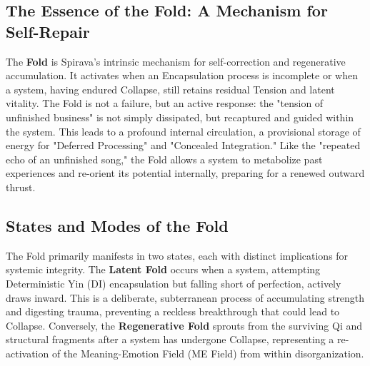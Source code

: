 \documentclass[11pt, a4paper]{article}
\begin{document}
\subsection{The Essence of the Fold: A Mechanism for Self-Repair}
The \textbf{Fold} is Spirava's intrinsic mechanism for self-correction and regenerative accumulation. It activates when an Encapsulation process is incomplete or when a system, having endured Collapse, still retains residual Tension and latent vitality. The Fold is not a failure, but an active response: the "tension of unfinished business" is not simply dissipated, but recaptured and guided within the system. This leads to a profound internal circulation, a provisional storage of energy for "Deferred Processing" and "Concealed Integration." Like the "repeated echo of an unfinished song," the Fold allows a system to metabolize past experiences and re-orient its potential internally, preparing for a renewed outward thrust.

\subsection{States and Modes of the Fold}
The Fold primarily manifests in two states, each with distinct implications for systemic integrity. The \textbf{Latent Fold} occurs when a system, attempting Deterministic Yin (DI) encapsulation but falling short of perfection, actively draws inward. This is a deliberate, subterranean process of accumulating strength and digesting trauma, preventing a reckless breakthrough that could lead to Collapse. Conversely, the \textbf{Regenerative Fold} sprouts from the surviving Qi and structural fragments after a system has undergone Collapse, representing a re-activation of the Meaning-Emotion Field (ME Field) from within disorganization.
\end{document}
